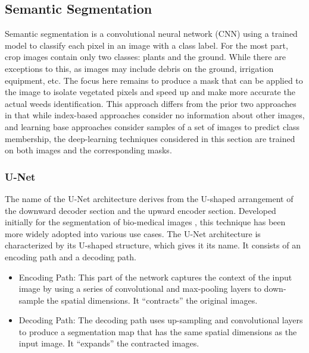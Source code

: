 \documentclass[letterpaper]{report}
\begin{document}
{{%
%
}

\subsection{Semantic Segmentation}
Semantic segmentation is a convolutional neural network (\gls{CNN}) using a trained model to classify each pixel in an image with a class label.  For the most part, crop images contain only two classes: plants and the ground. While there are exceptions to this,  as images may include debris on the ground, irrigation equipment, etc.  The focus here remains to produce a mask that can be applied to the image to isolate vegetated pixels and speed up and make more accurate the actual weeds identification. This approach differs from the prior two approaches in that while index-based approaches consider no information about other images, and learning base approaches consider samples of a set of images to predict class membership, the deep-learning techniques considered in this section are trained on both images and the corresponding masks.

\subsubsection{U-Net}
The name of the U-Net architecture derives from the U-shaped arrangement of the downward decoder section and the upward encoder section. Developed initially for the segmentation of bio-medical images \parencite{Ronneberger2015-ye}, this technique has been more widely adopted into various use cases. The U-Net architecture is characterized by its U-shaped structure, which gives it its name. It consists of an encoding path and a decoding path.
\begin{itemize}
	\item{Encoding Path: This part of the network captures the context of the input image by using a series of convolutional and max-pooling layers to down-sample the spatial dimensions. It “contracts” the original images.}
	\item{Decoding Path: The decoding path uses up-sampling and convolutional layers to produce a segmentation map that has the same spatial dimensions as the input image. It “expands” the contracted images.}
\end{itemize}

}
\end{document}

